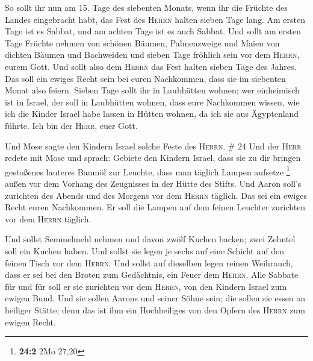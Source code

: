  So sollt ihr nun am 15. Tage des siebenten Monats, wenn
ihr die Früchte des Landes eingebracht habt, das Fest des \textsc{Herrn}
halten sieben Tage lang. Am ersten Tage ist es Sabbat, und am achten
Tage ist es auch Sabbat.  Und sollt am ersten Tage
Früchte nehmen von schönen Bäumen, Palmenzweige und Maien von dichten
Bäumen und Bachweiden und sieben Tage fröhlich sein vor dem
\textsc{Herrn}, eurem Gott.  Und sollt also dem
\textsc{Herrn} das Fest halten sieben Tage des Jahres. Das soll ein
ewiges Recht sein bei euren Nachkommen, dass sie im siebenten Monat also
feiern.  Sieben Tage sollt ihr in Laubhütten wohnen; wer
einheimisch ist in Israel, der soll in Laubhütten wohnen,
 dass eure Nachkommen wissen, wie ich die Kinder Israel
habe lassen in Hütten wohnen, da ich sie aus Ägyptenland führte. Ich bin
der \textsc{Herr}, euer Gott.

 Und Mose sagte den Kindern Israel solche Feste des
\textsc{Herrn}. \# 24  Und der \textsc{Herr} redete mit
Mose und sprach:  Gebiete den Kindern Israel, dass sie zu
dir bringen gestoßenes lauteres Baumöl zur Leuchte, dass man täglich
Lampen aufsetze \footnote{\textbf{24:2} 2Mo 27,20}  außen
vor dem Vorhang des Zeugnisses in der Hütte des Stifts. Und Aaron soll's
zurichten des Abends und des Morgens vor dem \textsc{Herrn} täglich. Das
sei ein ewiges Recht euren Nachkommen.  Er soll die Lampen
auf dem feinen Leuchter zurichten vor dem \textsc{Herrn} täglich.

 Und sollst Semmelmehl nehmen und davon zwölf Kuchen
backen; zwei Zehntel soll ein Kuchen haben.  Und sollst
sie legen je sechs auf eine Schicht auf den feinen Tisch vor dem
\textsc{Herrn}.  Und sollst auf dieselben legen reinen
Weihrauch, dass er sei bei den Broten zum Gedächtnis, ein Feuer dem
\textsc{Herrn}.  Alle Sabbate für und für soll er sie
zurichten vor dem \textsc{Herrn}, von den Kindern Israel zum ewigen
Bund.  Und sie sollen Aarons und seiner Söhne sein; die
sollen sie essen an heiliger Stätte; denn das ist ihm ein Hochheiliges
von den Opfern des \textsc{Herrn} zum ewigen Recht.

